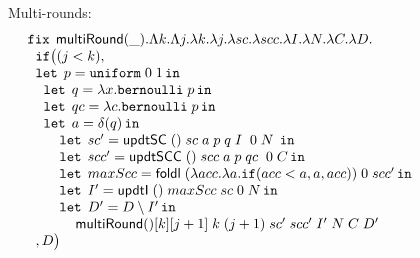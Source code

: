 \documentclass[a4paper,11pt]{article}
\theoremstyle{definition}
\begin{document}
\begin{figure}

\clearpage

Multi-rounds:
\[
\begin{array}{l}
 \mathop{\mathtt{fix}} \;  \mathsf{multiRound}(\_). \Lambda k. \Lambda j. \lambda k. \lambda j. \lambda sc. \lambda scc. \lambda
  I.   \lambda N. \lambda C. \lambda D.\\
 \hspace{.2cm} \mathtt{if}   \big (   (j < k)  ,  \\
  \hspace{.2cm} \mathop{\mathtt{let}} \; p = \mathtt{uniform} \; 0 \; 1 \mathop{ \mathtt{in}} \\
  \hspace{0.4cm} \mathop{\mathtt{let}} \; q = \lambda x. \mathtt{bernoulli} \; p \mathop{ \mathtt{in}} \\
 \hspace{0.4cm} \mathop{\mathtt{let}} \; qc = \lambda c. \mathtt{bernoulli} \; p \mathop{ \mathtt{in}} \\
 \hspace{0.4cm} \mathop{\mathtt{let}} \; a = \delta (q)  \mathop{ \mathtt{in}} \\
 \hspace{0.8cm} \mathop{\mathtt{let}} \; sc' =  \mathsf{updtSC} \; () \; sc  \; a \; p
 \; q \; I \;  \; 0 \;  N
  \;  \mathop{ \mathtt{in}} \\
\hspace{0.8cm} \mathop{\mathtt{let}} \; scc' =  \mathsf{updtSCC} \; () \; scc \; a \; p
 \; qc \;  \; 0 \;  C \mathop{ \mathtt{in}} \\
\hspace{0.8cm} \mathop{\mathtt{let}} \; maxScc =  \mathsf{foldl} \; (\lambda acc. \lambda a. \mathtt{if} ( acc < a, a, acc)) \; 0 \; scc' \mathop{ \mathtt{in}} \\
\hspace{0.8cm} \mathop{\mathtt{let}} \; I' =  \mathsf{updtI}  \; () \; maxScc \; sc
  \; 0 \; N  \mathop{ \mathtt{in}} \\
  \hspace{0.8cm} \mathop{\mathtt{let}} \; D' =  D \setminus I' \mathop{ \mathtt{in}} \\
  \hspace{1.2cm} \mathsf{multiRound} () [k] [j+1] \;  k \; (j+1)  \; sc' \; scc' \; I'
  \; N \; C \; D'\\ 
\hspace{0.2cm}   ,     D  \big ) \\
 
\end{array}
\]


\end{figure}
\end{document}
